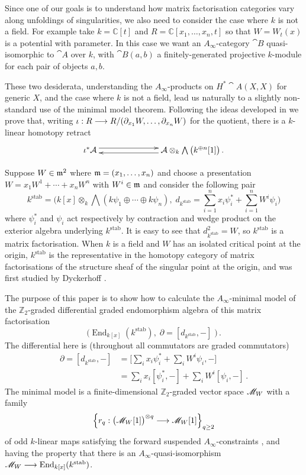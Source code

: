 \documentclass[english,letter paper,12pt,leqno]{article}
\theoremstyle{example}
\numberwithin{equation}{section}
\def\stab{\operatorname{stab}}
\def\be{\begin{equation}}
\def\ee{\end{equation}}
\def\nZ{\mathds{Z}}
\DeclareMathOperator{\End}{End}
\begin{document}
Since one of our goals is to understand how matrix factorisation categories vary along unfoldings of singularities, we also need to consider the case where $k$ is not a field. For example take $k = \mathbb{C}[t]$ and $R = \mathbb{C}[x_1,\ldots,x_n, t]$ so that $W = W_t(x)$ is a potential with parameter. In this case we want an $A_\infty$-category $\cat{B}$ quasi-isomorphic to $\cat{A}$ over $k$, with $\cat{B}(a,b)$ a finitely-generated projective $k$-module for each pair of objects $a,b$. 
\vspace{0.2cm}

These two desiderata, understanding the $A_\infty$-products on $H^*\cat{A}(X,X)$ for generic $X$, and the case where $k$ is not a field, lead us naturally to a slightly non-standard use of the minimal model theorem. Following the ideas developed in \cite{??,??,??} we prove that, writing $\iota: R \longrightarrow R/(\partial_{x_1} W, \ldots, \partial_{x_n} W)$ for the quotient, there is a $k$-linear homotopy retract
\be\label{eq:intro_he}
\xymatrix@C+4pc{
\iota^* \cat{A} \ar@<0.7ex>[r] & \cat{A} \otimes_k \bigwedge\big( k^{\oplus n}[1] \big) \ar@<0.7ex>[l]\,.
}
\ee

Suppose $W \in \mathfrak{m}^2$ where $\mathfrak{m} = (x_1,\ldots,x_n)$ and choose a presentation $W = x_1 W^1 + \cdots + x_n W^n$ with $W^i \in \mathfrak{m}$ and consider the following pair
\begin{equation}\label{eq:kstab}
k^{\operatorname{stab}} = \Big( k[x] \otimes_k \bigwedge( k\psi_1 \oplus \cdots \oplus k \psi_n ), \;d_{k^{\stab}} = \sum_{i=1}^n x_i \psi_i^* + \sum_{i=1}^n W^i \psi_i \Big)
\end{equation}
where $\psi_i^*$ and $\psi_i$ act respectively by contraction and wedge product on the exterior algebra underlying $k^{\stab}$. It is easy to see that $d_{k^{\stab}}^2 = W$, so $k^{\stab}$ is a matrix factorisation. When $k$ is a field and $W$ has an isolated critical point at the origin, $k^{\stab}$ is the representative in the homotopy category of matrix factorisations of the structure sheaf of the singular point at the origin, and was first studied by Dyckerhoff \cite{d0904.4713}. 

The purpose of this paper is to show how to calculate the $A_\infty$-minimal model of the $\nZ_2$-graded differential graded endomorphism algebra of this matrix factorisation
\be\label{eq:defnaw}
\Big( \End_{k[x]}(k^{\operatorname{stab}}), \; \partial = [d_{k^{\stab}},-] \; \Big)\,.
\ee 
The differential here is (throughout all commutators are graded commutators)
\begin{align*}
\partial = [d_{k^{\stab}},-] &= \Big[\sum_i x_i \psi_i^* + \sum_i W^i \psi_i, -\Big]\\
&= \sum_i x_i [\psi_i^*,-] + \sum_i W^i [\psi_i,-]\,.
\end{align*}
The minimal model is a finite-dimensional $\nZ_2$-graded vector space $\mathscr{M}_W$ with a family 
\[
\left\{ r_q: \big(\mathscr{M}_W[1]\big)^{\otimes q} \longrightarrow \mathscr{M}_W[1] \right\}_{q \ge 2}
\]
of odd $k$-linear maps satisfying the forward suspended $A_\infty$-constraints \cite{lazaroiu}, and having the property that there is an $A_\infty$-quasi-isomorphism $\md{M}_W \lto \End_{k[x]}(k^{\stab})$.
\end{document}
